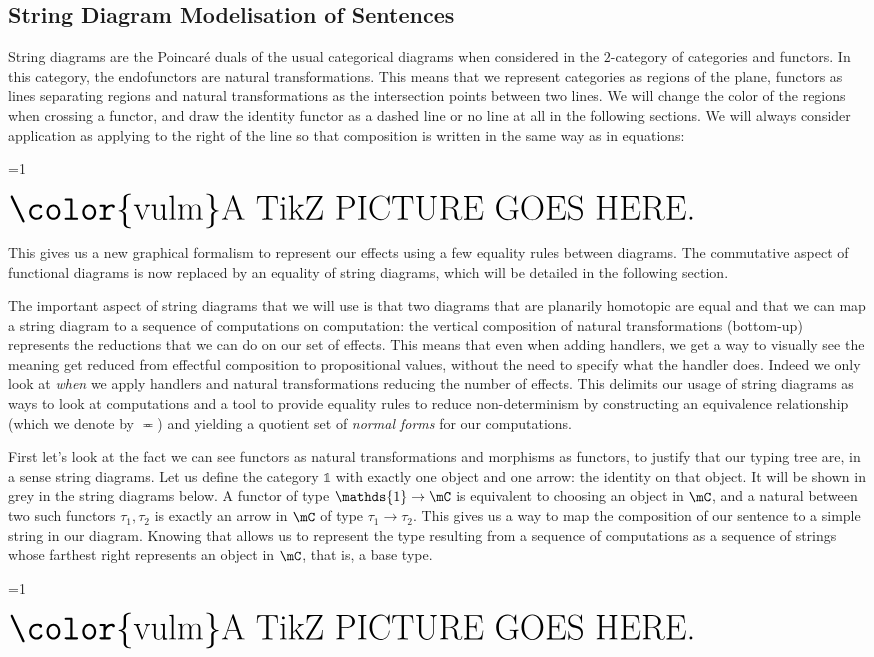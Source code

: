 \documentclass[math, english, info]{cours}
\makeatletter
\def\tikzimp@rt{0}
\def\inputtikz#1{
	\ifnum\tikzimp@rt=1
		
	\else
		\ensuremath{\text{\Huge\color{vulm}A TikZ PICTURE GOES HERE.}}
	\fi
}
\makeatother
\begin{document}
\subsection{String Diagram Modelisation of Sentences}
\label{subsec:sd}
String diagrams are the Poincaré duals of the usual categorical diagrams when considered in the $2$-category of categories and functors.
In this category, the endofunctors are natural transformations.
This means that we represent categories as regions of the plane, functors as lines separating regions and natural transformations as the intersection points between two lines.
We will change the color of the regions when crossing a functor, and draw the identity functor as a dashed line or no line at all in the following sections.
We will always consider application as applying to the right of the line so that composition is written in the same way as in equations:
\begin{center}
	\inputtikz{sd-examples}
\end{center}
This gives us a new graphical formalism to represent our effects using a few equality rules between diagrams.
The commutative aspect of functional diagrams is now replaced by an equality of string diagrams, which will be detailed in the following section.

The important aspect of string diagrams that we will use is that two diagrams that are planarily homotopic are equal \cite{delpeuchNormalizationPlanarString2022} and that we can map a string diagram to a sequence of computations on computation: the vertical composition of natural transformations (bottom-up) represents the reductions that we can do on our set of effects.
This means that even when adding handlers, we get a way to visually see the meaning get reduced from effectful composition to propositional values, without the need to specify what the handler does.
Indeed we only look at \emph{when} we apply handlers and natural transformations reducing the number of effects.
This delimits our usage of string diagrams as ways to look at computations and a tool to provide equality rules to reduce non-determinism by constructing an equivalence relationship (which we denote by $\eqcirc$) and yielding a quotient set of \emph{normal forms} for our computations.

\medskip

First let's look at the fact we can see functors as natural transformations and morphisms as functors, to justify that our typing tree are, in a sense string diagrams.
Let us define the category $\mathds{1}$ with exactly one object and one arrow: the identity on that object. It will be shown in grey in the string diagrams below.
A functor of type $\mathds{1} \to \mC$ is equivalent to choosing an object in $\mC$, and a natural between two such functors $\tau_{1}, \tau_{2}$ is exactly an arrow in $\mC$ of type $\tau_{1} \to \tau_{2}$.
This gives us a way to map the composition of our sentence to a simple string in our diagram.
Knowing that allows us to represent the type resulting from a sequence of computations as a sequence of strings whose farthest right represents an object in $\mC$, that is, a base type.
\begin{center}
	\inputtikz{sd-thecatsleeps}
\end{center}
\end{document}
